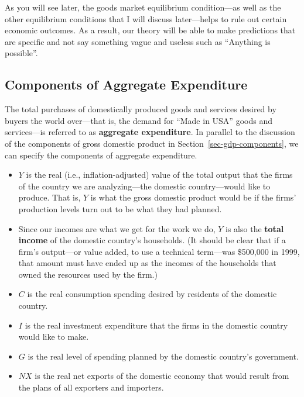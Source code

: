 \documentclass[
  letterpaper,
]{book}
\providecommand{\tightlist}{%
  \setlength{\itemsep}{0pt}\setlength{\parskip}{0pt}}\usepackage{longtable,booktabs,array}
\theoremstyle{plain}
\theoremstyle{remark}
\begin{document}
As you will see later, the goods market equilibrium condition---as well
as the other equilibrium conditions that I will discuss later---helps to
rule out certain economic outcomes. As a result, our theory will be able
to make predictions that are specific and not say something vague and
useless such as ``Anything is possible''.

\subsection{Components of Aggregate Expenditure}\label{sec-goodseqmdef}

The total purchases of domestically produced goods and services desired
by buyers the world over---that is, the demand for ``Made in USA'' goods
and services---is referred to as \textbf{aggregate
expenditure}. In parallel to the discussion
of the components of gross domestic product in
Section~\ref{sec-gdp-components}, we can specify the components of
aggregate expenditure.

\begin{itemize}
\tightlist
\item
  \(Y\) is the real (i.e., inflation-adjusted) value of the total output
  that the firms of the country we are analyzing---the domestic
  country---would like to produce. That is, \(Y\) is what the gross
  domestic product would be if the firms' production levels turn out to
  be what they had planned.
\item
  Since our incomes are what we get for the work we do, \(Y\) is also
  the \textbf{total income} of the domestic country's households. (It
  should be clear that if a firm's output---or value added, to use a
  technical term---was \$500,000 in 1999, that amount must have ended up
  as the incomes of the households that owned the resources used by the
  firm.)
\item
  \(C\) is the real consumption spending desired by residents of the
  domestic country.
\item
  \(I\) is the real investment expenditure that the firms in the
  domestic country would like to make.
\item
  \(G\) is the real level of spending planned by the domestic country's
  government.
\item
  \(NX\) is the real net exports of the domestic
  economy that would result from the plans of all exporters and
  importers.
\end{itemize}
\end{document}
